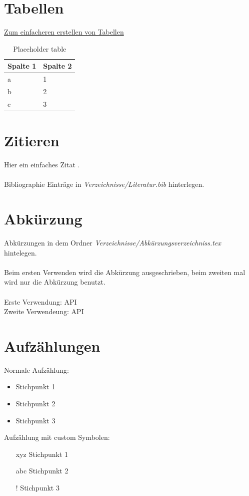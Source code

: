 \section{Tabellen}
\label{sec:Tabellen}
%
\href{https://www.latex-tables.com/}{Zum einfacheren erstellen von Tabellen}
%
\begin{table}[htpb]
    \centering
    \caption{Placeholder table}
    \label{tab:placeholder} 
    \begin{tabular}{ll}
    Spalte 1 & Spalte 2  \\ 
    \hline
    a        & 1         \\
    b        & 2         \\
    c        & 3        
    \end{tabular}
\end{table}
%
%
\section{Zitieren}
\label{sec:Zitieren}
%
Hier ein einfaches Zitat \cite{bibkey}.\\\\
%
Bibliographie Einträge in \textit{Verzeichnisse/Literatur.bib} hinterlegen.
%
%
\section{Abkürzung}
\label{sec:Abkürzung}
%
Abkürzungen in dem Ordner \textit{Verzeichnisse/Abkürzungsverzeichniss.tex} hintelegen.\\\\
%
Beim ersten Verwenden wird die Abkürzung ausgeschrieben, beim zweiten mal wird nur die Abkürzung benutzt.\\\\
%
Erste Verwendung: \ac{API}\\
Zweite Verwendeung: \ac{API}
%
%
\section{Aufzählungen}
\label{sec:Aufzählungen}
%
Normale Aufzählung:
%
\begin{itemize}
    \item Stichpunkt 1
    \item Stichpunkt 2
    \item Stichpunkt 3
\end{itemize}
%
Aufzählung mit custom Symbolen:
%
\begin{itemize}
    \item[xyz] Stichpunkt 1
    \item[abc] Stichpunkt 2
    \item[!] Stichpunkt 3
\end{itemize}
%
%
